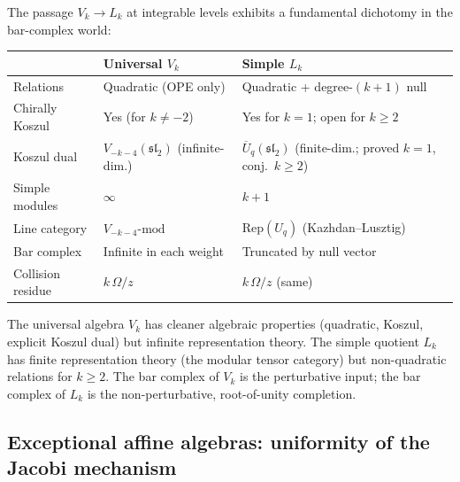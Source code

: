 \begin{remark}
\label{rem:universal-vs-simple-dichotomy}
The passage $V_k \to L_k$ at integrable levels exhibits a
fundamental dichotomy in the bar-complex world:
\begin{center}
\renewcommand{\arraystretch}{1.3}
\small
\begin{tabular}{lll}
& \textbf{Universal $V_k$} & \textbf{Simple $L_k$} \\
\hline
Relations & Quadratic (OPE only) & Quadratic + degree-$(k{+}1)$
 null \\
Chirally Koszul & Yes (for $k \ne -2$) & Yes for $k = 1$;
 open for $k \ge 2$ \\
Koszul dual & $V_{-k-4}(\mathfrak{sl}_2)$ (infinite-dim.)
 & $\overline{U}_q(\mathfrak{sl}_2)$
 (finite-dim.; proved $k{=}1$, conj.\ $k{\ge}2$) \\
Simple modules & $\infty$ & $k + 1$ \\
Line category & $V_{-k-4}\text{-mod}$ & $\mathrm{Rep}(U_q)$
 (Kazhdan--Lusztig) \\
Bar complex & Infinite in each weight & Truncated by null vector \\
Collision residue & $k\,\Omega/z$ & $k\,\Omega/z$ (same) \\
\end{tabular}
\end{center}
The universal algebra $V_k$ has cleaner algebraic properties
(quadratic, Koszul, explicit Koszul dual) but infinite
representation theory. The simple quotient $L_k$ has finite
representation theory (the modular tensor category) but
non-quadratic relations for $k \ge 2$. The bar complex of
$V_k$ is the perturbative input; the bar complex of $L_k$ is
the non-perturbative, root-of-unity completion.
\end{remark}


%
%

\subsection{Exceptional affine algebras: uniformity of the Jacobi mechanism}
\label{subsec:exceptional-affine}

